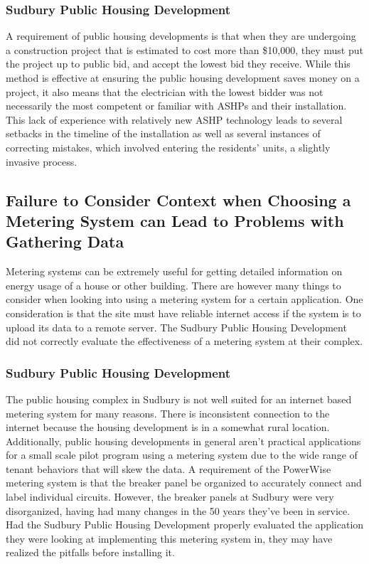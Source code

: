 \subsubsection{Sudbury Public Housing Development}
\par A requirement of public housing developments is that when they are undergoing a construction project that is estimated to cost more than \$10,000, they must put the project up to public bid, and accept the lowest bid they receive. While this method is effective at ensuring the public housing development saves money on a project, it also means that the electrician with the lowest bidder was not necessarily the most competent or familiar with ASHPs and their installation. This lack of experience with relatively new ASHP technology leads to several setbacks in the timeline of the installation as well as several instances of correcting mistakes, which involved entering the residents’ units, a slightly invasive process.

\subsection{Failure to Consider Context when Choosing a Metering System can Lead to Problems with Gathering Data}
\par Metering systems can be extremely useful for getting detailed information on energy usage of a house or other building. There are however many things to consider when looking into using a metering system for a certain application. One consideration is that the site must have reliable internet access if the system is to upload its data to a remote server. The Sudbury Public Housing Development did not correctly evaluate the effectiveness of a metering system at their complex.

\subsubsection{Sudbury Public Housing Development}
\par The public housing complex in Sudbury is not well suited for an internet based metering system for many reasons. There is inconsistent connection to the internet because the housing development is in a somewhat rural location. Additionally, public housing developments in general aren’t practical applications for a small scale pilot program using a metering system due to the wide range of tenant behaviors that will skew the data. A requirement of the PowerWise metering system is that the breaker panel be organized to accurately connect and label individual circuits. However, the breaker panels at Sudbury were very disorganized, having had many changes in the 50 years they’ve been in service. Had the Sudbury Public Housing Development properly evaluated the application they were looking at implementing this metering system in, they may have realized the pitfalls before installing it.

